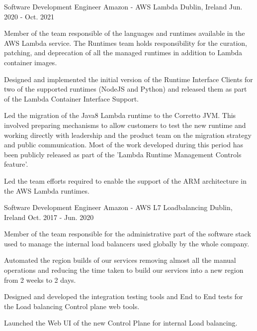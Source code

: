 \begin{cventries}
  \cventry
    {Software Development Engineer} %
    {Amazon - AWS Lambda} %
    {Dublin, Ireland} %
    {Jun. 2020 - Oct. 2021} %
    {}
    {
      \begin{cvitems} %
        \item {Member of the team responsible of the languages and runtimes available in the AWS Lambda service. The Runtimes team holds responsibility for the curation, patching, and deprecation of all the managed runtimes in addition to Lambda container images.}
        \item {Designed and implemented the initial version of the Runtime Interface Clients for two of the supported runtimes (NodeJS and Python) and released them as part of the Lambda Container Interface Support.}
        \item {Led the migration of the Java8 Lambda runtime to the Corretto JVM. This involved preparing mechanisms to allow customers to test the new runtime and working directly with leadership and the product team on the migration strategy and public communication. Most of the work developed during this period has been publicly released as part of the 'Lambda Runtime Management Controls feature'.}
        \item {Led the team efforts required to enable the support of the ARM architecture in the AWS Lambda runtimes.}
      \end{cvitems}
    }
  \cventry
    {Software Development Engineer} %
    {Amazon - AWS L7 Loadbalancing} %
    {Dublin, Ireland} %
    {Oct. 2017 - Jun. 2020} %
    {}
    {
      \begin{cvitems} %
        \item {Member of the team responsible for the administrative part of the software stack used to manage the internal load balancers used globally by the whole company.}
        \item {Automated the region builds of our services removing almost all the manual operations and reducing the time taken to build our services into a new region from 2 weeks to 2 days.}
        \item {Designed and developed the integration testing tools and End to End tests for the Load balancing Control plane web tools.}
        \item {Launched the Web UI of the new Control Plane for internal Load balancing.}
      \end{cvitems}
    }


\end{cventries}
